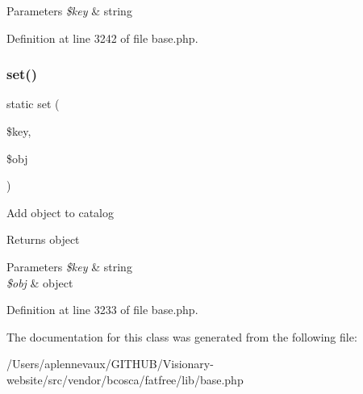 \begin{DoxyParams}{Parameters}
{\em \$key} & string \\
\hline
\end{DoxyParams}


Definition at line 3242 of file base.\+php.

\hypertarget{class_registry_a8e135dfaf92afaa049c3f0bfe3437820}{}\label{class_registry_a8e135dfaf92afaa049c3f0bfe3437820} 
\subsubsection{\texorpdfstring{set()}{set()}}
{\footnotesize\ttfamily static set (\begin{DoxyParamCaption}\item[{}]{\$key,  }\item[{}]{\$obj }\end{DoxyParamCaption})\hspace{0.3cm}{\ttfamily [static]}}

Add object to catalog \begin{DoxyReturn}{Returns}
object 
\end{DoxyReturn}

\begin{DoxyParams}{Parameters}
{\em \$key} & string \\
\hline
{\em \$obj} & object \\
\hline
\end{DoxyParams}


Definition at line 3233 of file base.\+php.



The documentation for this class was generated from the following file\+:\begin{DoxyCompactItemize}
\item 
/\+Users/aplennevaux/\+G\+I\+T\+H\+U\+B/\+Visionary-\/website/src/vendor/bcosca/fatfree/lib/base.\+php\end{DoxyCompactItemize}
